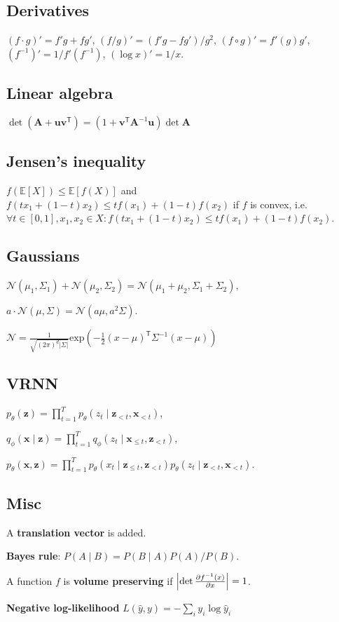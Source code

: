 \documentclass[11pt,landscape,a4paper,fleqn]{article}
\newcommand*{\tran}{^{\mathsf{T}}} %
\newcommand{\E}{\mathbb{E}}
\renewcommand{\exp}{\mathrm{exp}}
\def\myvector#1{\mathbf{#1}}
\def\vu{{\myvector{u}}}
\def\vv{{\myvector{v}}}
\def\vx{{\myvector{x}}}
\def\vz{{\myvector{z}}}
\def\mymatrix#1{\mathbf{#1}}
\def\mA{{\mymatrix{A}}}
\begin{document}
\begin{multicols*}{4}
\subsection*{Derivatives}

$(f \cdot g)' = f'g + fg'$,
$(f / g)' = (f'g - fg') / g^2$,
$(f \circ g)' = f'(g)g'$,
$(f^{-1})' = 1 / f'(f^{-1})$,
$(\log x)' = 1 / x$.

\subsection*{Linear algebra}

$\det(\mA + \vu\vv\tran) = (1 + \vv\tran \mA^{-1}\vu) \det \mA$

\subsection*{Jensen's inequality}
$f(\E[X]) \leq \E[f(X)]$ and $f(tx_1 + (1 - t)x_2) \leq tf(x_1) + (1 - t)f(x_2)$ if $f$ is convex, i.e. $\forall t \in [0, 1], x_1, x_2 \in X : f(tx_1 + (1 - t)x_2) \leq tf(x_1) + (1 - t)f(x_2)$.

\subsection*{Gaussians}

$\mathcal{N}(\mu_1, \Sigma_1) + \mathcal{N}(\mu_2, \Sigma_2)
= \mathcal{N}(\mu_1 + \mu_2, \Sigma_1 + \Sigma_2)$,

$a \cdot \mathcal{N}(\mu, \Sigma) = \mathcal{N}(a\mu, a^2\Sigma)$.

$\mathcal{N} = \frac{1}{\sqrt{(2\pi)^d |\Sigma|}} \exp( - \frac{1}{2} (x - \mu)\tran \Sigma^{-1} (x - \mu))$

\subsection*{VRNN}

$p_\theta(\vz) = \prod_{t = 1}^T p_\theta(z_t \mid \vz_{ < t}, \vx_{ < t})$,

$q_\phi(\vx \mid \vz) = \prod_{t = 1}^T q_\phi(z_t \mid \vx_{ \leq t}, \vz_{ < t})$,

$p_\theta(\vx, \vz) = \prod_{t = 1}^T p_\theta(x_t \mid \vz_{ \leq t}, \vz_{ < t})p_\theta(z_t \mid \vz_{ < t}, \vx_{ < t})$.

\subsection*{Misc}
A \textbf{translation vector} is added.

\textbf{Bayes rule}:
$P(A \mid B) = P(B \mid A)P(A) / P(B)$.

A function $f$ is \textbf{volume preserving} if $\left|\det \pdv{f^{-1}(x)}{x}\right| = 1$.

\textbf{Negative log-likelihood} $L(\hat{y}, y) = - \sum_i y_i \log \hat{y}_i$

\end{multicols*}
\end{document}
